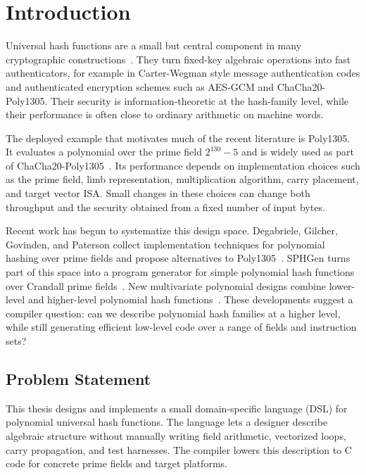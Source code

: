 \chapter{Introduction}
\label{ch:introduction}

Universal hash functions are a small but central component in many cryptographic constructions~\cite{carter1979universal}. They turn fixed-key algebraic operations into fast authenticators, for example in Carter-Wegman style message authentication codes and authenticated encryption schemes such as AES-GCM and ChaCha20-Poly1305. Their security is information-theoretic at the hash-family level, while their performance is often close to ordinary arithmetic on machine words.

The deployed example that motivates much of the recent literature is Poly1305. It evaluates a polynomial over the prime field \(2^{130}-5\) and is widely used as part of ChaCha20-Poly1305~\cite{bernstein2005poly1305aes}. Its performance depends on implementation choices such as the prime field, limb representation, multiplication algorithm, carry placement, and target vector ISA. Small changes in these choices can change both throughput and the security obtained from a fixed number of input bytes.

Recent work has begun to systematize this design space. Degabriele, Gilcher, Govinden, and Paterson collect implementation techniques for polynomial hashing over prime fields and propose alternatives to Poly1305~\cite{degabriele2024sok}. SPHGen turns part of this space into a program generator for simple polynomial hash functions over Crandall prime fields~\cite{pegolotti2026sphgen}. New multivariate polynomial designs combine lower-level and higher-level polynomial hash functions~\cite{gilcher2026newdesigns}. These developments suggest a compiler question: can we describe polynomial hash families at a higher level, while still generating efficient low-level code over a range of fields and instruction sets?

\section{Problem Statement}
\label{sec:problem-statement}

This thesis designs and implements a small domain-specific language (DSL) for polynomial universal hash functions. The language lets a designer describe algebraic structure without manually writing field arithmetic, vectorized loops, carry propagation, and test harnesses. The compiler lowers this description to C code for concrete prime fields and target platforms.

